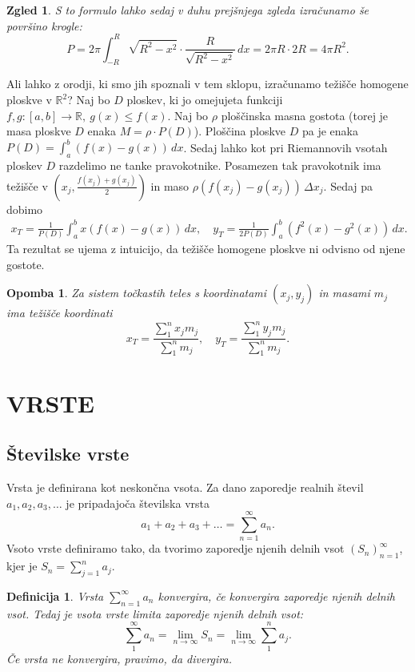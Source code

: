 \documentclass[10pt, a4paper]{article}
\newtheorem{defi}{Definicija}[section]
\newenvironment{noticeB}{%
  \tcolorbox[%
  notitle,
  empty,
  enhanced,  %
  breakable,
  coltext=black,
  colback=white, 
  fontupper=\rmfamily,
  parbox=false,
  noparskip,
  sharp corners,
  boxrule=-1pt,  %
  frame hidden,
  left=7pt,  %
  right=7pt,
  top=5pt,
  bottom=5pt,
  before skip=2.5ex plus 2pt,
  after skip=2.5ex plus 2pt,
  borderline west = {1.5pt}{-0.1pt}{blue!30!black}, %
  overlay unbroken and last={%
    \draw[color=black, line width=1.25pt]
    ($(frame.south west)+(1.pt, -0.1pt)$) -- ++(2em, 0);
  }
  ]}
{\endtcolorbox}
\newenvironment{definicija}{\begin{defi}\begin{noticeB}}{%
    \end{noticeB}\end{defi}}
\newtheorem*{opomba}{Opomba}
\newtheorem{zgled}{Zgled}[section]
\newcommand{\R}{\mathbb {R}}
\newcommand{\limzap}[1]{\lim_{n \to \infty} {#1}}
\begin{document}
\begin{zgled}
    S to formulo lahko sedaj v duhu prejšnjega zgleda izračunamo še površino krogle:
    $$P = 2\pi \int_{-R} ^R  \sqrt{R^2 - x^2} \cdot \frac{R}{\sqrt{R^2 - x^2}}\,dx = 2\pi R \cdot 2R = 4 \pi R^2.$$
\end{zgled}

Ali lahko z orodji, ki smo jih spoznali v tem sklopu, izračunamo težišče homogene ploskve v $\R^2$?
Naj bo $D$ ploskev, ki jo omejujeta funkciji $f,g: [a, b] \rightarrow \R,\ g(x) \leq f(x)$.
Naj bo $\rho$ ploščinska masna gostota (torej je masa ploskve $D$ enaka $M = \rho \cdot P(D)$).
Ploščina ploskve $D$ pa je enaka $P(D) = \int_a ^b (f(x) - g(x))\,dx$.
Sedaj lahko kot pri Riemannovih vsotah ploskev $D$ razdelimo ne tanke pravokotnike. 
Posamezen tak pravokotnik ima težišče v $\left(x_j, \frac{f(x_j) + g(x_j)}{2} \right)$ in maso $\rho (f(x_j) - g(x_j))\,\Delta x_j$.
Sedaj pa dobimo
\begin{align*}
    x_T = \frac{1}{P(D)} \int_a ^b x(f(x) - g(x))\,dx, \quad y_T = \frac{1}{2P(D)} \int_a ^b (f^2(x) - g^2(x))\,dx.
\end{align*}
Ta rezultat se ujema z intuicijo, da težišče homogene ploskve ni odvisno od njene gostote.

\begin{opomba}
    Za sistem točkastih teles s koordinatami $(x_j, y_j)$ in masami $m_j$ ima težišče koordinati 
    $$x_T = \frac{\sum_1 ^n x_j m_j}{\sum_1 ^n m_j},\quad y_T = \frac{\sum_1 ^n y_j m_j}{\sum_1 ^n m_j}.$$
\end{opomba}

\clearpage
\section{VRSTE}

\subsection{Številske vrste}
Vrsta je definirana kot neskončna vsota.
Za dano zaporedje realnih števil $a_1, a_2, a_3, \ldots$ je pripadajoča številska vrsta 
$$a_1 + a_2 + a_3 + \dots = \sum_{n=1} ^\infty a_n.$$
Vsoto vrste definiramo tako, da tvorimo zaporedje njenih delnih vsot $(S_n)_{n=1} ^\infty$, kjer je $S_n = \sum_{j=1} ^n a_j$.

\begin{definicija}
    Vrsta $\sum_{n=1} ^\infty a_n$ konvergira, če konvergira zaporedje njenih delnih vsot. 
    Tedaj je vsota vrste limita zaporedje njenih delnih vsot:
    $$\sum_1 ^\infty a_n = \lim_{n \to \infty} S_n = \limzap{\sum_1 ^n a_j}.$$
    Če vrsta ne konvergira, pravimo, da divergira.
\end{definicija}
\end{document}
